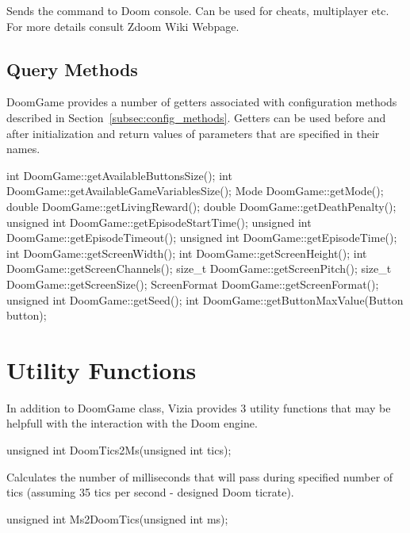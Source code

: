 	Sends the command to Doom console. Can be used for cheats, multiplayer etc. For more details consult Zdoom Wiki Webpage\cite{zdoom-wiki}.


\vspace{20pt}
\subsection{Query Methods}

	DoomGame provides a number of getters associated with configuration methods described in Section~\ref{subsec:config_methods}. Getters can be used before and after initialization and return values of parameters that are specified in their names.


\vspace{20pt}
\begin{clinee}
int DoomGame::getAvailableButtonsSize();
int DoomGame::getAvailableGameVariablesSize();
Mode DoomGame::getMode();
double DoomGame::getLivingReward();
double DoomGame::getDeathPenalty();
unsigned int DoomGame::getEpisodeStartTime();
unsigned int DoomGame::getEpisodeTimeout();
unsigned int DoomGame::getEpisodeTime();
int DoomGame::getScreenWidth();
int DoomGame::getScreenHeight();
int DoomGame::getScreenChannels();
size_t DoomGame::getScreenPitch();
size_t DoomGame::getScreenSize();
ScreenFormat DoomGame::getScreenFormat();
unsigned int DoomGame::getSeed();
int DoomGame::getButtonMaxValue(Button button);
\end{clinee}


\section {Utility Functions}
	In addition to DoomGame class, Vizia provides 3 utility functions that may be helpfull with the interaction with the Doom engine.

\vspace{20pt}
\begin{clinee}
unsigned int DoomTics2Ms(unsigned int tics);
\end{clinee}

	Calculates the number of milliseconds that will pass during specified number of tics (assuming 35 tics per second - designed Doom ticrate).


\vspace{20pt}
\begin{clinee}
unsigned int Ms2DoomTics(unsigned int ms);
\end{clinee}

